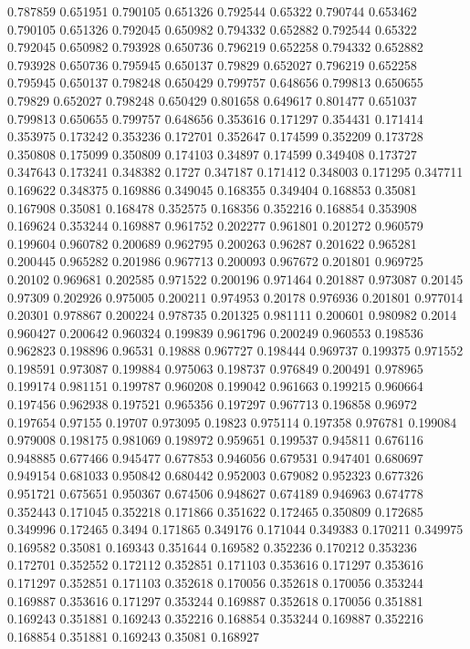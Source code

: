 0.787859 0.651951
0.790105 0.651326
0.792544 0.65322
0.790744 0.653462
0.790105 0.651326
0.792045 0.650982
0.794332 0.652882
0.792544 0.65322
0.792045 0.650982
0.793928 0.650736
0.796219 0.652258
0.794332 0.652882
0.793928 0.650736
0.795945 0.650137
0.79829 0.652027
0.796219 0.652258
0.795945 0.650137
0.798248 0.650429
0.799757 0.648656
0.799813 0.650655
0.79829 0.652027
0.798248 0.650429
0.801658 0.649617
0.801477 0.651037
0.799813 0.650655
0.799757 0.648656
0.353616 0.171297
0.354431 0.171414
0.353975 0.173242
0.353236 0.172701
0.352647 0.174599
0.352209 0.173728
0.350808 0.175099
0.350809 0.174103
0.34897 0.174599
0.349408 0.173727
0.347643 0.173241
0.348382 0.1727
0.347187 0.171412
0.348003 0.171295
0.347711 0.169622
0.348375 0.169886
0.349045 0.168355
0.349404 0.168853
0.35081 0.167908
0.35081 0.168478
0.352575 0.168356
0.352216 0.168854
0.353908 0.169624
0.353244 0.169887
0.961752 0.202277
0.961801 0.201272
0.960579 0.199604
0.960782 0.200689
0.962795 0.200263
0.96287 0.201622
0.965281 0.200445
0.965282 0.201986
0.967713 0.200093
0.967672 0.201801
0.969725 0.20102
0.969681 0.202585
0.971522 0.200196
0.971464 0.201887
0.973087 0.20145
0.97309 0.202926
0.975005 0.200211
0.974953 0.20178
0.976936 0.201801
0.977014 0.20301
0.978867 0.200224
0.978735 0.201325
0.981111 0.200601
0.980982 0.2014
0.960427 0.200642
0.960324 0.199839
0.961796 0.200249
0.960553 0.198536
0.962823 0.198896
0.96531 0.19888
0.967727 0.198444
0.969737 0.199375
0.971552 0.198591
0.973087 0.199884
0.975063 0.198737
0.976849 0.200491
0.978965 0.199174
0.981151 0.199787
0.960208 0.199042
0.961663 0.199215
0.960664 0.197456
0.962938 0.197521
0.965356 0.197297
0.967713 0.196858
0.96972 0.197654
0.97155 0.19707
0.973095 0.19823
0.975114 0.197358
0.976781 0.199084
0.979008 0.198175
0.981069 0.198972
0.959651 0.199537
0.945811 0.676116
0.948885 0.677466
0.945477 0.677853
0.946056 0.679531
0.947401 0.680697
0.949154 0.681033
0.950842 0.680442
0.952003 0.679082
0.952323 0.677326
0.951721 0.675651
0.950367 0.674506
0.948627 0.674189
0.946963 0.674778
0.352443 0.171045
0.352218 0.171866
0.351622 0.172465
0.350809 0.172685
0.349996 0.172465
0.3494 0.171865
0.349176 0.171044
0.349383 0.170211
0.349975 0.169582
0.35081 0.169343
0.351644 0.169582
0.352236 0.170212
0.353236 0.172701
0.352552 0.172112
0.352851 0.171103
0.353616 0.171297
0.353616 0.171297
0.352851 0.171103
0.352618 0.170056
0.352618 0.170056
0.353244 0.169887
0.353616 0.171297
0.353244 0.169887
0.352618 0.170056
0.351881 0.169243
0.351881 0.169243
0.352216 0.168854
0.353244 0.169887
0.352216 0.168854
0.351881 0.169243
0.35081 0.168927
